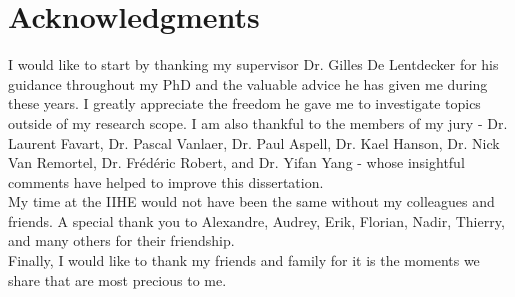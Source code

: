 \chapter*{Acknowledgments}

  I would like to start by thanking my supervisor Dr. Gilles De Lentdecker for his guidance throughout my PhD and the valuable advice he has given me during these years. I greatly appreciate the freedom he gave me to investigate topics outside of my research scope. I am also thankful to the members of my jury - Dr. Laurent Favart, Dr. Pascal Vanlaer, Dr. Paul Aspell, Dr. Kael Hanson, Dr. Nick Van Remortel, Dr. Frédéric Robert, and Dr. Yifan Yang -  whose insightful comments have helped to improve this dissertation. \\

  My time at the IIHE would not have been the same without my colleagues and friends. A special thank you to Alexandre, Audrey, Erik, Florian, Nadir, Thierry, and many others for their friendship. \\

  Finally, I would like to thank my friends and family for it is the moments we share that are most precious to me.
